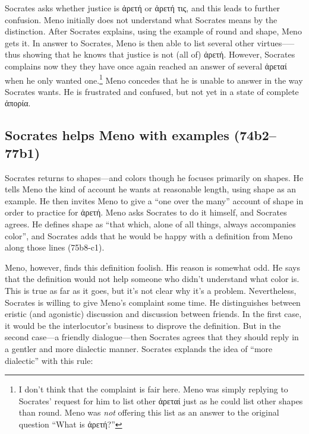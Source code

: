 \documentclass[11pt]{article}
\begin{document}
Socrates asks whether justice is {\g ἀρετή} or {\g ἀρετή τις}, and this leads to further confusion. Meno initially does not understand what Socrates means by the distinction. After Socrates explains, using the example of round and shape, Meno gets it. In answer to Socrates, Meno is then able to list several other virtues--—thus showing that he knows that justice is not (all of) {\g ἀρετή}. However, Socrates complains now they they have once again reached an answer of several {\g ἀρεταί} when he only wanted one.\footnote{I don't think that the complaint is fair here. Meno was simply replying to Socrates' request for him to list other {\g ἀρεταί} just as he could list other shapes than round. Meno was \emph{not} offering this list as an answer to the original question ``What is {\g ἀρετή}?''} Meno concedes that he is unable to answer in the way Socrates wants. He is frustrated and confused, but not yet in a state of complete {\g ἀπορία}.

\subsection{Socrates helps Meno with examples (74b2--77b1)}

Socrates returns to shapes---and colors though he focuses primarily on shapes. He tells Meno the kind of account he wants at reasonable length, using shape as an example. He then invites Meno to give a ``one over the many'' account of shape in order to practice for {\g ἀρετή}. Meno asks Socrates to do it himself, and Socrates agrees. He defines shape as ``that which, alone of all things, always accompanies color'', and Socrates adds that he would be happy with a definition from Meno along those lines (75b8-c1).

Meno, however, finds this definition foolish. His reason is somewhat odd. He says that the definition would not help someone who didn't understand what color is. This is true as far as it goes, but it's not clear why it's a problem. Nevertheless, Socrates is willing to give Meno's complaint some time. He distinguishes between eristic (and agonistic) discussion and discussion between friends. In the first case, it would be the interlocutor's business to disprove the definition. But in the second case---a friendly dialogue---then Socrates agrees that they should reply in a gentler and more dialectic manner. Socrates explands the idea of ``more dialectic'' with this rule:
\end{document}
